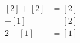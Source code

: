 \documentclass[preview]{standalone}
\begin{document}
\begin{align*}
\begin{aligned}[2] + [2] &= [2] \\[1] + [1] &= [2] \\2 + [1] &= [1]\end{aligned}
\end{align*}
\end{document}
